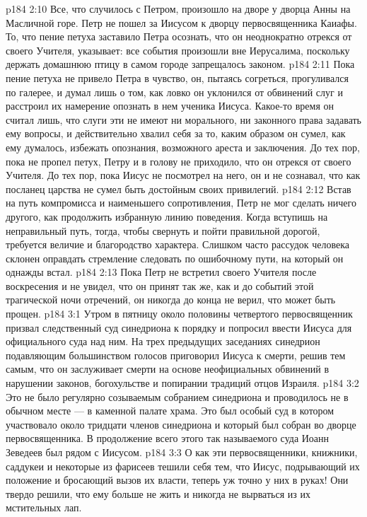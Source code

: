 \vs p184 2:10 \pc Все, что случилось с Петром, произошло на дворе у дворца Анны на Масличной горе. Петр не пошел за Иисусом к дворцу первосвященника Каиафы. То, что пение петуха заставило Петра осознать, что он неоднократно отрекся от своего Учителя, указывает: все события произошли вне Иерусалима, поскольку держать домашнюю птицу в самом городе запрещалось законом.
\vs p184 2:11 \pc Пока пение петуха не привело Петра в чувство, он, пытаясь согреться, прогуливался по галерее, и думал лишь о том, как ловко он уклонился от обвинений слуг и расстроил их намерение опознать в нем ученика Иисуса. Какое\hyp{}то время он считал лишь, что слуги эти не имеют ни морального, ни законного права задавать ему вопросы, и действительно хвалил себя за то, каким образом он сумел, как ему думалось, избежать опознания, возможного ареста и заключения. До тех пор, пока не пропел петух, Петру и в голову не приходило, что он отрекся от своего Учителя. До тех пор, пока Иисус не посмотрел на него, он и не сознавал, что как посланец царства не сумел быть достойным своих привилегий.
\vs p184 2:12 Встав на путь компромисса и наименьшего сопротивления, Петр не мог сделать ничего другого, как продолжить избранную линию поведения. Когда вступишь на неправильный путь, тогда, чтобы свернуть и пойти правильной дорогой, требуется величие и благородство характера. Слишком часто рассудок человека склонен оправдать стремление следовать по ошибочному пути, на который он однажды встал.
\vs p184 2:13 Пока Петр не встретил своего Учителя после воскресения и не увидел, что он принят так же, как и до событий этой трагической ночи отречений, он никогда до конца не верил, что может быть прощен.
\vs p184 3:1 Утром в пятницу около половины четвертого первосвященник призвал следственный суд синедриона к порядку и попросил ввести Иисуса для официального суда над ним. На трех предыдущих заседаниях синедрион подавляющим большинством голосов приговорил Иисуса к смерти, решив тем самым, что он заслуживает смерти на основе неофициальных обвинений в нарушении законов, богохульстве и попирании традиций отцов Израиля.
\vs p184 3:2 Это не было регулярно созываемым собранием синедриона и проводилось не в обычном месте --- в каменной палате храма. Это был особый суд в котором участвовало около тридцати членов синедриона и который был собран во дворце первосвященника. В продолжение всего этого так называемого суда Иоанн Зеведеев был рядом с Иисусом.
\vs p184 3:3 О как эти первосвященники, книжники, саддукеи и некоторые из фарисеев тешили себя тем, что Иисус, подрывающий их положение и бросающий вызов их власти, теперь уж точно у них в руках! Они твердо решили, что ему больше не жить и никогда не вырваться из их мстительных лап.
